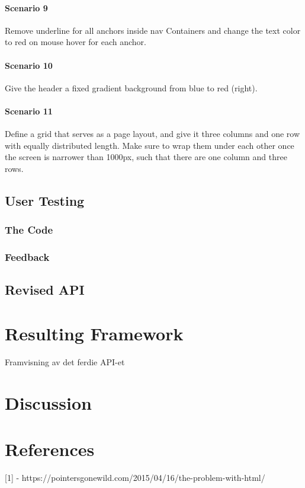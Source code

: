 \documentclass[12pt]{article}
\begin{document}
        \paragraph{Scenario 9}
        Remove underline for all anchors inside nav Containers and change the text color to red on mouse hover for each anchor.
            
        \paragraph{Scenario 10}
        Give the header a fixed gradient background from blue to red (right).

        \paragraph{Scenario 11}
        Define a grid that serves as a page layout, and give it three columns and one row with equally distributed length. Make sure to wrap them under each other once the screen is narrower than 1000px, such that there are one column and three rows.

    \subsection{User Testing}

        \subsubsection{The Code}

        \subsubsection{Feedback}

    \subsection{Revised API}

\section{Resulting Framework}
Framvisning av det ferdie API-et

\section{Discussion}

\section{References}
[1] - https://pointersgonewild.com/2015/04/16/the-problem-with-html/
\end{document}

